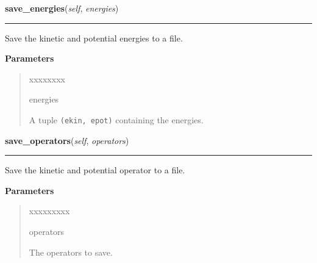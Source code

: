     \vspace{0.5ex}

\hspace{.8\funcindent}\begin{boxedminipage}{\funcwidth}

    \raggedright \textbf{save\_energies}(\textit{self}, \textit{energies})

    \vspace{-1.5ex}

    \rule{\textwidth}{0.5\fboxrule}
\setlength{\parskip}{2ex}
    Save the kinetic and potential energies to a file.

\setlength{\parskip}{1ex}
      \textbf{Parameters}
      \vspace{-1ex}

      \begin{quote}
        \begin{Ventry}{xxxxxxxx}

          \item[energies]

          A tuple \texttt{(ekin, epot)} containing the energies.

        \end{Ventry}

      \end{quote}

    \end{boxedminipage}

    \label{Serializer:Serializer:save_operators}

    \vspace{0.5ex}

\hspace{.8\funcindent}\begin{boxedminipage}{\funcwidth}

    \raggedright \textbf{save\_operators}(\textit{self}, \textit{operators})

    \vspace{-1.5ex}

    \rule{\textwidth}{0.5\fboxrule}
\setlength{\parskip}{2ex}
    Save the kinetic and potential operator to a file.

\setlength{\parskip}{1ex}
      \textbf{Parameters}
      \vspace{-1ex}

      \begin{quote}
        \begin{Ventry}{xxxxxxxxx}

          \item[operators]

          The operators to save.

        \end{Ventry}

      \end{quote}

    \end{boxedminipage}

